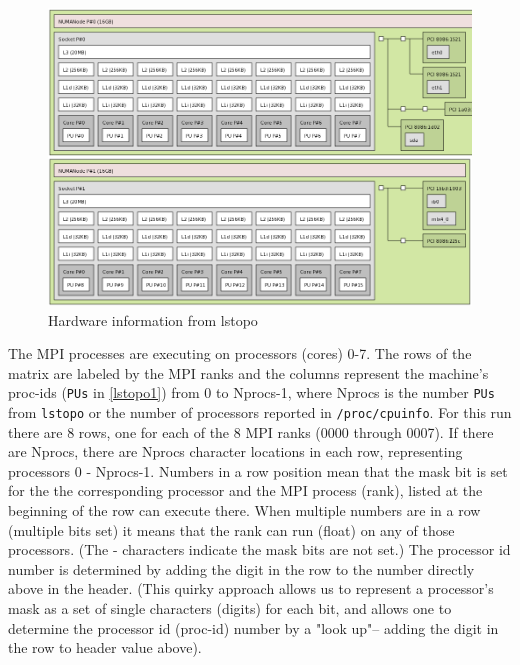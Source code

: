 \documentclass[10pt,a4paper]{report}
\begin{document}
\begin{figure}[t]
\centering
\includegraphics[scale=0.34]{lstopo}
\caption{Hardware information from lstopo\label{fig:lstopo1}}
\end{figure}

The MPI processes are executing on processors (cores) 0-7. 
The rows of the matrix are labeled by the MPI ranks and the columns represent the
machine's proc-ids (\verb+PUs+ in \ref{lstopo1}) from 0 to Nprocs-1, where Nprocs is 
the number \verb+PUs+ from \verb+lstopo+ or the number of processors reported 
in \verb+/proc/cpuinfo+.  
For this run there are 8 rows, one for each of the 8 MPI ranks (0000 through 0007).
If there are Nprocs, there are Nprocs character locations in each row, 
representing processors 0 - Nprocs-1.
Numbers in a row position mean that the mask bit is set for the the corresponding
processor and the MPI process (rank), listed at the beginning of the row can 
execute there. When multiple numbers 
are in a row (multiple bits set) it means that the rank can run (float) on any 
of those processors. (The - characters indicate the mask bits are not set.)
The processor id number is determined by adding the digit in the row to the number
directly above in the header. (This quirky approach allows us to represent a 
processor's mask as a set of single characters (digits)
for each bit, and allows one to determine the processor id (proc-id) number by a "look up"-- 
adding the digit in the row to header value above).


\end{document}
